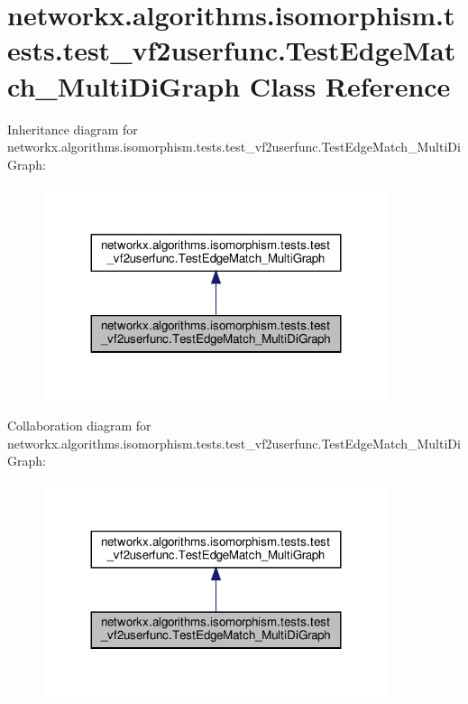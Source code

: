 \hypertarget{classnetworkx_1_1algorithms_1_1isomorphism_1_1tests_1_1test__vf2userfunc_1_1TestEdgeMatch__MultiDiGraph}{}\section{networkx.\+algorithms.\+isomorphism.\+tests.\+test\+\_\+vf2userfunc.\+Test\+Edge\+Match\+\_\+\+Multi\+Di\+Graph Class Reference}
\label{classnetworkx_1_1algorithms_1_1isomorphism_1_1tests_1_1test__vf2userfunc_1_1TestEdgeMatch__MultiDiGraph}


Inheritance diagram for networkx.\+algorithms.\+isomorphism.\+tests.\+test\+\_\+vf2userfunc.\+Test\+Edge\+Match\+\_\+\+Multi\+Di\+Graph\+:
\nopagebreak
\begin{figure}[H]
\begin{center}
\leavevmode
\includegraphics[width=287pt]{classnetworkx_1_1algorithms_1_1isomorphism_1_1tests_1_1test__vf2userfunc_1_1TestEdgeMatch__MultiDiGraph__inherit__graph}
\end{center}
\end{figure}


Collaboration diagram for networkx.\+algorithms.\+isomorphism.\+tests.\+test\+\_\+vf2userfunc.\+Test\+Edge\+Match\+\_\+\+Multi\+Di\+Graph\+:
\nopagebreak
\begin{figure}[H]
\begin{center}
\leavevmode
\includegraphics[width=287pt]{classnetworkx_1_1algorithms_1_1isomorphism_1_1tests_1_1test__vf2userfunc_1_1TestEdgeMatch__MultiDiGraph__coll__graph}
\end{center}
\end{figure}
